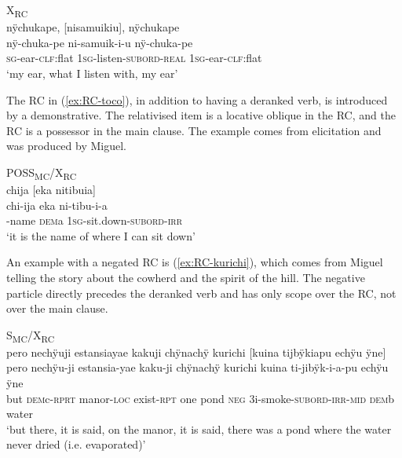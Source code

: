 \ea\label{ex:Ear-RC}
\begingl
\glpreamble  \textup{X\textsubscript{RC}}\\nÿchukape, \textup{[}nisamuikiu\textup{]}, nÿchukape\\
\gla nÿ-chuka-pe ni-samuik-i-u nÿ-chuka-pe\\
\textsc{sg}-ear-\textsc{clf:}flat 1\textsc{sg}-listen-\textsc{subord}-\textsc{real} 1\textsc{sg}-ear-\textsc{clf:}flat\\
\glft ‘my ear, what I listen with, my ear’
\endgl
\trailingcitation{[rxx-e121128s-4x.078-079]}
\xe

The RC in (\ref{ex:RC-toco}), in addition to having a deranked verb, is introduced by a demonstrative. The relativised item is a locative oblique in the RC, and the RC is a possessor in the main clause. The example comes from elicitation and was produced by Miguel.

\ea\label{ex:RC-toco}
\begingl
\glpreamble  \textup{POSS\textsubscript{MC}/X\textsubscript{RC}}\\chija \textup{[}eka nitibuia\textup{]}\\
\gla chi-ija eka ni-tibu-i-a\\
-name \textsc{dem}a 1\textsc{sg}-sit.down-\textsc{subord}-\textsc{irr}\\
\glft ‘it is the name of where I can sit down’
\endgl
\trailingcitation{[rmx-e150922l.126]}
\xe

An example with a negated RC is (\ref{ex:RC-kurichi}), which comes from Miguel telling the story about the cowherd and the spirit of the hill. The negative particle directly precedes the deranked verb and has only scope over the RC, not over the main clause.

\ea\label{ex:RC-kurichi}
\begingl 
\glpreamble \textup{S\textsubscript{MC}/X\textsubscript{RC}}\\pero nechÿuji estansiayae kakuji chÿnachÿ kurichi \textup{[}kuina tijbÿkiapu echÿu ÿne\textup{]}\\
\gla pero nechÿu-ji estansia-yae kaku-ji chÿnachÿ kurichi kuina ti-jibÿk-i-a-pu echÿu ÿne\\ 
\glb but \textsc{dem}c-\textsc{rprt} manor-\textsc{loc} exist-\textsc{rpt} one pond \textsc{neg} 3i-smoke-\textsc{subord}-\textsc{irr}-\textsc{mid} \textsc{dem}b water\\ 
\glft ‘but there, it is said, on the manor, it is said, there was a pond where the water never dried (i.e. evaporated)’\\ 
\endgl
\trailingcitation{[mxx-n151017l-1.06-07]}
\xe
{}

